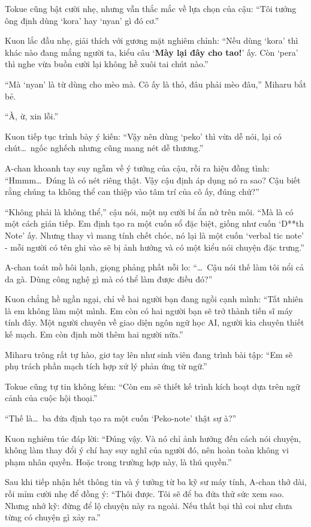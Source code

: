 \documentclass[../main.tex]{subfiles}
\begin{document}
Tokue cũng bật cười nhẹ, nhưng vẫn thắc mắc về lựa chọn của cậu: ``Tôi tưởng ông định dùng `kora' hay `nyan' gì đó cơ.''

Kuon lắc đầu nhẹ, giải thích với gương mặt nghiêm chỉnh: ``Nếu dùng `kora' thì khác nào đang mắng người ta, kiểu câu `\textbf{Mày lại đây cho tao!}' ấy. Còn `pera' thì nghe vừa buồn cười lại không hề xuôi tai chút nào.''

``Mà `nyan' là từ dùng cho mèo mà. Cô ấy là thỏ, đâu phải mèo đâu,'' Miharu bắt bẻ.

``À, ừ, xin lỗi.''

Kuon tiếp tục trình bày ý kiến: ``Vậy nên dùng `peko' thì vừa dễ nói, lại có chút\dots\ ngốc nghếch nhưng cũng mang nét dễ thương.''

A-chan khoanh tay suy ngẫm về ý tưởng của cậu, rồi ra hiệu đồng tình: ``Hmmm\dots\ Đúng là có nét riêng thật. Vậy cậu định áp dụng nó ra sao? Cậu biết rằng chúng ta không thể can thiệp vào tâm trí của cô ấy, đúng chứ?''

``Không phải là không thể,'' cậu nói, một nụ cười bí ẩn nở trên môi. ``Mà là có một cách gián tiếp. Em định tạo ra một cuốn sổ đặc biệt, giống như cuốn `D**th Note' ấy. Nhưng thay vì mang tính chết chóc, nó lại là một cuốn `verbal tic note' - mỗi người có tên ghi vào sẽ bị ảnh hưởng và có một kiểu nói chuyện đặc trưng.''

A-chan toát mồ hôi lạnh, giọng phảng phất nỗi lo: ``\dots\ Cậu nói thế làm tôi nổi cả da gà. Dùng công nghệ gì mà có thể làm được điều đó?''

Kuon chẳng hề ngần ngại, chỉ về hai người bạn đang ngồi cạnh mình: ``Tất nhiên là em không làm một mình. Em còn có hai người bạn sẽ trở thành tiến sĩ máy tính đây. Một người chuyên về giao diện ngôn ngữ học AI, người kia chuyên thiết kế mạch. Em còn định mời thêm hai người nữa.''

Miharu trông rất tự hào, giơ tay lên như sinh viên đang trình bài tập: ``Em sẽ phụ trách phần mạch tích hợp xử lý phản ứng từ ngữ.''

Tokue cũng tự tin không kém: ``Còn em sẽ thiết kế trình kích hoạt dựa trên ngữ cảnh của cuộc hội thoại.''

``Thế là\dots\ ba đứa định tạo ra một cuốn `Peko-note' thật sự à?''

Kuon nghiêm túc đáp lời: ``Đúng vậy. Và nó chỉ ảnh hưởng đến cách nói chuyện, không làm thay đổi ý chí hay suy nghĩ của người đó, nên hoàn toàn không vi phạm nhân quyền. Hoặc trong trường hợp này, là thú quyền.''

Sau khi tiếp nhận hết thông tin và ý tưởng từ ba kỹ sư máy tính, A-chan thở dài, rồi mỉm cười nhẹ để đồng ý: ``Thôi được. Tôi sẽ để ba đứa thử sức xem sao. Nhưng nhớ kỹ: đừng để lộ chuyện này ra ngoài. Nếu thất bại thì coi như chưa từng có chuyện gì xảy ra.''
\end{document}
